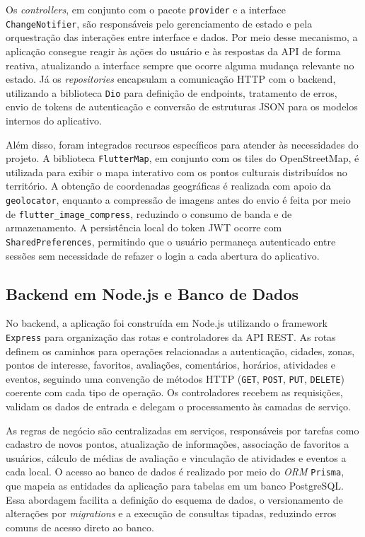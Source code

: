 Os \textit{controllers}, em conjunto com o pacote \texttt{provider} e a interface \texttt{ChangeNotifier}, são responsáveis pelo gerenciamento de estado e pela orquestração das interações entre interface e dados. Por meio desse mecanismo, a aplicação consegue reagir às ações do usuário e às respostas da API de forma reativa, atualizando a interface sempre que ocorre alguma mudança relevante no estado. Já os \textit{repositories} encapsulam a comunicação HTTP com o backend, utilizando a biblioteca \texttt{Dio} para definição de endpoints, tratamento de erros, envio de tokens de autenticação e conversão de estruturas JSON para os modelos internos do aplicativo.

Além disso, foram integrados recursos específicos para atender às necessidades do projeto. A biblioteca \texttt{FlutterMap}, em conjunto com os tiles do OpenStreetMap, é utilizada para exibir o mapa interativo com os pontos culturais distribuídos no território. A obtenção de coordenadas geográficas é realizada com apoio da \texttt{geolocator}, enquanto a compressão de imagens antes do envio é feita por meio de \texttt{flutter\_image\_compress}, reduzindo o consumo de banda e de armazenamento. A persistência local do token JWT ocorre com \texttt{SharedPreferences}, permitindo que o usuário permaneça autenticado entre sessões sem necessidade de refazer o login a cada abertura do aplicativo.

\subsection{Backend em Node.js e Banco de Dados}

No backend, a aplicação foi construída em Node.js utilizando o framework \texttt{Express} para organização das rotas e controladores da API REST. As rotas definem os caminhos para operações relacionadas a autenticação, cidades, zonas, pontos de interesse, favoritos, avaliações, comentários, horários, atividades e eventos, seguindo uma convenção de métodos HTTP (\texttt{GET}, \texttt{POST}, \texttt{PUT}, \texttt{DELETE}) coerente com cada tipo de operação. Os controladores recebem as requisições, validam os dados de entrada e delegam o processamento às camadas de serviço.

As regras de negócio são centralizadas em serviços, responsáveis por tarefas como cadastro de novos pontos, atualização de informações, associação de favoritos a usuários, cálculo de médias de avaliação e vinculação de atividades e eventos a cada local. O acesso ao banco de dados é realizado por meio do \textit{ORM} \texttt{Prisma}, que mapeia as entidades da aplicação para tabelas em um banco PostgreSQL. Essa abordagem facilita a definição do esquema de dados, o versionamento de alterações por \textit{migrations} e a execução de consultas tipadas, reduzindo erros comuns de acesso direto ao banco.


